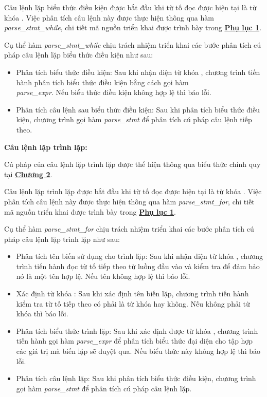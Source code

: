 Câu lệnh lặp biểu thức điều kiện được bắt đầu khi từ tố đọc được hiện tại là từ khóa . Việc phân tích câu lệnh này được thực hiện thông qua hàm \textit{parse\_stmt\_while}, chi tiết mã nguồn triển khai được trình bày trong \hyperref[ap1:stmtduring]{\bf Phụ lục 1}. %

Cụ thể hàm \textit{parse\_stmt\_while} chịu trách nhiệm triển khai các bước phân tích cú pháp câu lệnh lặp biểu thức điều kiện như sau:
\begin{itemize}
    \item Phân tích biểu thức điều kiện:
    Sau khi nhận diện từ khóa , chương trình tiến hành phân tích biểu thức điều kiện bằng cách gọi hàm \\\textit{parse\_expr}. Nếu biểu thức điều kiện không hợp lệ thì báo lỗi.
    \item Phân tích câu lệnh sau biểu thức điều kiện:
    Sau khi phân tích biểu thức điều kiện, chương trình gọi hàm \textit{parse\_stmt} để phân tích cú pháp câu lệnh tiếp theo.
\end{itemize}

\textbf{Câu lệnh lặp trình lặp:} 

Cú pháp của câu lệnh lặp trình lặp được thể hiện thông qua biểu thức chính quy tại \hyperref[ch2:while_stmt]{\bf Chương 2}.

Câu lệnh lặp trình lặp được bắt đầu khi từ tố đọc được hiện tại là từ khóa . Việc phân tích câu lệnh này được thực hiện thông qua hàm \textit{parse\_stmt\_for}, chi tiết mã nguồn triển khai được trình bày trong \hyperref[ap1:stmtfor]{\bf Phụ lục 1}. %

Cụ thể hàm \textit{parse\_stmt\_for} chịu trách nhiệm triển khai các bước phân tích cú pháp câu lệnh lặp trình lặp như sau:

\begin{itemize}
    \item Phân tích tên biến sử dụng cho trình lặp:
    Sau khi nhận diện từ khóa , chương trình tiến hành đọc từ tố tiếp theo từ luồng đầu vào và kiểm tra để đảm bảo nó là một tên hợp lệ. Nếu tên không hợp lệ thì báo lỗi. %
    \item Xác định từ khóa :
    Sau khi xác định tên biến lặp, chương trình tiến hành kiểm tra từ tố tiếp theo có phải là từ khóa  hay không. Nếu không phải từ khóa  thì báo lỗi. %
    \item Phân tích biểu thức trình lặp:
    Sau khi xác định được từ khóa , chương trình tiến hành gọi hàm \textit{parse\_expr} để phân tích biểu thức đại diện cho tập hợp các giá trị mà biến lặp sẽ duyệt qua. Nếu biểu thức này không hợp lệ thì báo lỗi. %
    \item Phân tích câu lệnh lặp:
    Sau khi phân tích biểu thức điều kiện, chương trình gọi hàm \textit{parse\_stmt} để phân tích cú pháp câu lệnh lặp.
\end{itemize}

